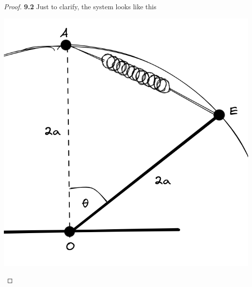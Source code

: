 \documentclass[11pt]{article}
\theoremstyle{definition}
\begin{document}
	\begin{proof}{\textbf{9.2}}
        Just to clarify, the system looks like this
        \begin{center}
            \includegraphics[scale=0.4]{ch9-2.png}
        \end{center}
        

\end{proof}
\end{document}
